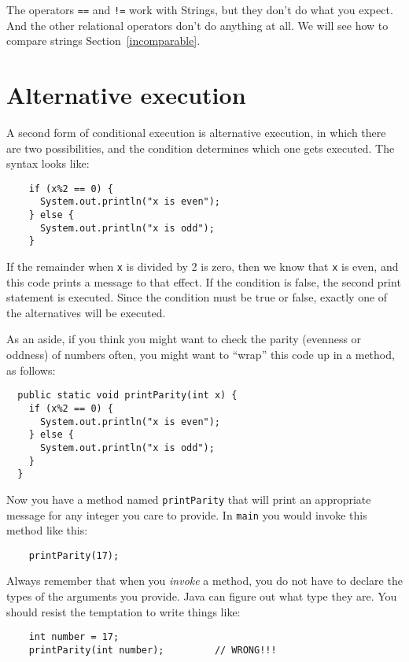 \documentclass[12pt]{book}
\theoremstyle{definition}
\begin{document}
The operators {\tt ==} and {\tt !=} work with Strings, but they
don't do what you expect.  And the other relational operators
don't do anything at all.
We will see how to compare strings Section~\ref{incomparable}.


\section {Alternative execution}
\label{alternative}

A second form of conditional execution is alternative execution,
in which there are two possibilities, and the condition determines
which one gets executed.  The syntax looks like:

\begin{lstlisting}
    if (x%2 == 0) {
      System.out.println("x is even");
    } else {
      System.out.println("x is odd");
    }
\end{lstlisting}
%
If the remainder when {\tt x} is divided by 2 is zero, then
we know that {\tt x} is even, and this code prints a message
to that effect.  If the condition is false, the second
print statement is executed.  Since the condition must
be true or false, exactly one of the alternatives will be
executed.

As an aside, if you think you might want to check the parity
(evenness or oddness) of numbers often, you might want to
``wrap'' this code up in a method, as follows:

\begin{lstlisting}
  public static void printParity(int x) {
    if (x%2 == 0) {
      System.out.println("x is even");
    } else {
      System.out.println("x is odd");
    }
  }
\end{lstlisting}
%
Now you have a method named {\tt printParity} that will print
an appropriate message for any integer you care to provide.
In {\tt main} you would invoke this method like this:

\begin{lstlisting}
    printParity(17);
\end{lstlisting}
%
Always remember that when you {\em invoke} a method, you do
not have to declare the types of the arguments you provide.
Java can figure out what type they are.  You should resist the
temptation to write things like:

\begin{lstlisting}
    int number = 17;
    printParity(int number);         // WRONG!!!
\end{lstlisting}
\end{document}
